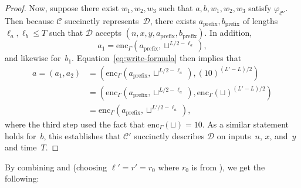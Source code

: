 \documentclass[11pt]{article}
\theoremstyle{definition}
\newcommand{\decider}{\mathcal{D}}
\newcommand{\circuit}{\mathcal{C}}
\begin{document}
\begin{proof}
  Now, suppose there exist $w_1, w_2, w_3$ such that $a, b, w_1, w_2, w_3$
  satisfy $\varphi_{\circuit'}$.
  Then because $\circuit$ succinctly represents~$\decider$, there exists
  $a_{\mathrm{prefix}}, b_{\mathrm{prefix}}$ of lengths $\ell_a, \ell_b \leq T$
  such that $\decider$ accepts $(n, x, y, a_{\mathrm{prefix}},
  b_{\mathrm{prefix}})$.
  In addition,
  \begin{equation*}
    a_1 = \mathrm{enc}_\Gamma(a_{\mathrm{prefix}}, \sqcup^{L/2-\ell_a}),
  \end{equation*}
  and likewise for~$b_1$.
  Equation~\eqref{eq:write-formula} then implies that
  \begin{align*}
    a = (a_1, a_2)
    &= (\mathrm{enc}_\Gamma(a_{\mathrm{prefix}}, \sqcup^{L/2-\ell_a}),
      (10)^{(L' - L)/2})\\
    &= (\mathrm{enc}_\Gamma(a_{\mathrm{prefix}}, \sqcup^{L/2-\ell_a}),
      \mathrm{enc}_\Gamma(\sqcup)^{(L' - L)/2})\\
    &= \mathrm{enc}_\Gamma(a_{\mathrm{prefix}}, \sqcup^{L'/2-\ell_a}),
  \end{align*}
  where the third step used the fact that $\mathrm{enc}_\Gamma(\sqcup) = 10$.
  As a similar statement holds for~$b$, this establishes that $\circuit'$
  succinctly describes $\decider$ on inputs~$n$, $x$, and~$y$ and time~$T$.
\end{proof}

By combining  and
 (choosing $\ell' = r' = r_0$ where $r_0$ is
from ), we get the following:

\newcommand{\paddedsuccinctdecider}{\mathsf{PaddedSuccinctDecider}}
\end{document}
